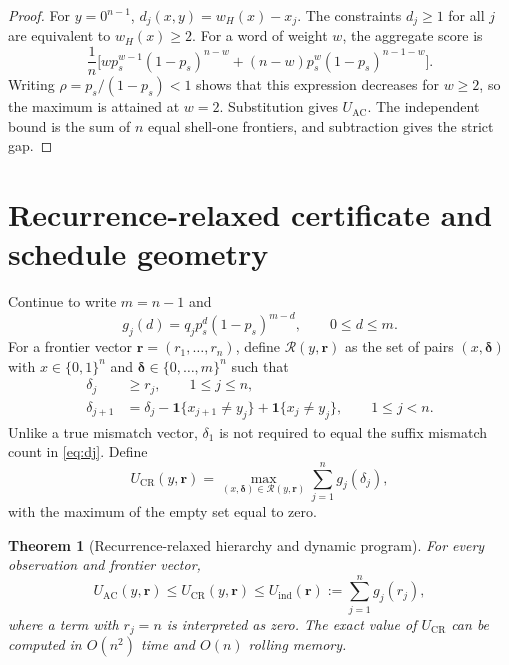 \documentclass[11pt]{article}
\newtheorem{theorem}{Theorem}
\theoremstyle{remark}
\newcommand{\ind}{\mathbf 1}
\begin{document}
\begin{proof}
For $y=0^{n-1}$, $d_j(x,y)=w_H(x)-x_j$. The constraints $d_j\ge1$ for all $j$ are
equivalent to $w_H(x)\ge2$. For a word of weight $w$, the aggregate score is
\[
 \frac1n\bigl[w p_s^{w-1}(1-p_s)^{n-w}
 +(n-w)p_s^w(1-p_s)^{n-1-w}\bigr].
\]
Writing $\rho=p_s/(1-p_s)<1$ shows that this expression decreases for $w\ge2$, so the
maximum is attained at $w=2$. Substitution gives $U_{\mathrm{AC}}$. The independent
bound is the sum of $n$ equal shell-one frontiers, and subtraction gives the strict gap.
\end{proof}

\section{Recurrence-relaxed certificate and schedule geometry}

Continue to write $m=n-1$ and
\[
 g_j(d)=q_jp_s^d(1-p_s)^{m-d},\qquad 0\le d\le m.
\]
For a frontier vector $\mathbf r=(r_1,\ldots,r_n)$, define
$\mathcal R(y,\mathbf r)$ as the set of pairs
$(x,\boldsymbol\delta)$ with $x\in\{0,1\}^n$ and
$\boldsymbol\delta\in\{0,\ldots,m\}^n$ such that
\begin{align}
 \delta_j&\ge r_j,\qquad 1\le j\le n,\label{eq:cr-threshold}\\
 \delta_{j+1}&=\delta_j-\ind\{x_{j+1}\ne y_j\}
                  +\ind\{x_j\ne y_j\},\qquad 1\le j<n.\label{eq:cr-recurrence}
\end{align}
Unlike a true mismatch vector, $\delta_1$ is not required to equal the suffix mismatch
count in \eqref{eq:dj}. Define
\[
 U_{\mathrm{CR}}(y,\mathbf r)=
 \max_{(x,\boldsymbol\delta)\in\mathcal R(y,\mathbf r)}
 \sum_{j=1}^n g_j(\delta_j),
\]
with the maximum of the empty set equal to zero.

\begin{theorem}[Recurrence-relaxed hierarchy and dynamic program]
For every observation and frontier vector,
\[
 U_{\mathrm{AC}}(y,\mathbf r)
 \le U_{\mathrm{CR}}(y,\mathbf r)
 \le U_{\mathrm{ind}}(\mathbf r):=\sum_{j=1}^n g_j(r_j),
\]
where a term with $r_j=n$ is interpreted as zero. The exact value of
$U_{\mathrm{CR}}$ can be computed in $O(n^2)$ time and $O(n)$ rolling memory.
\end{theorem}
\end{document}
